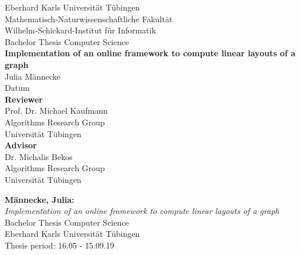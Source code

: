 \documentclass[twoside,12pt,a4paper]{report}
\begin{document}
 
\begin{titlepage}
 \begin{center}
  {\LARGE Eberhard Karls Universit\"at T\"ubingen}\\
  {\large Mathematisch-Naturwissenschaftliche Fakult\"at \\
Wilhelm-Schickard-Institut f\"ur Informatik\\[4cm]}
  {\huge Bachelor Thesis Computer Science\\[2cm]}
  {\Large\bf  Implementation of an online framework to
compute linear layouts of a graph\\[1.5cm]}
 {\large Julia M\"annecke}\\[0.5cm]
Datum\\[3cm]
{\small\bf Reviewer}\\[0.3cm]
{\large Prof. Dr. Michael Kaufmann}\\
  {\footnotesize Algorithms Research Group\\
	Universität Tübingen}\\[0.5cm]	
	

{\small\bf Advisor}\\[0.3cm]
{\large Dr. Michalis Bekos}\\
  {\footnotesize Algorithms Research Group\\
	Universität Tübingen}\end{center}
	
  
\end{titlepage}


\thispagestyle{empty}
\vspace*{\fill}
\begin{minipage}{11.2cm}
\textbf{M\"annecke, Julia:}\\
\emph{Implementation of an online framework to
compute linear layouts of a graph}\\ Bachelor Thesis Computer Science\\
Eberhard Karls Universit\"at T\"ubingen\\
Thesis period: 16.05 - 15.09.19
\end{minipage}
\newpage
\end{document}
